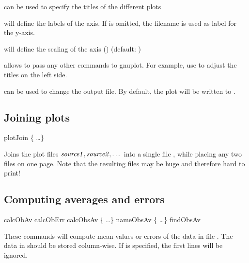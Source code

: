 \begin{essyntex}
\begin{arguments}
\item[\opt{titles \{ \var{title1} \var{title2} \dots \}}] can be used
  to specify the titles of the different plots
\item[\opt{labels \{ \var{xlabel} \opt{\var{ylabel}} \}}] will define the
  labels of the axis. If  is omitted, the filename
   is used as label for the y-axis.
\item[\opt{scale \var{gnuplot-scale}}] will define the scaling of the
  axis (\eg {}) (default: )
\item[\opt{cmd \var{gnuplot-command}}] allows to pass any other
  commands to gnuplot. For example, use
   to adjust the titles on
  the left side.
\item[\opt{out \var{filebase}}] can be used to change the output
  file. By default, the plot will be written to .
\end{arguments}

\subsection{Joining plots}
\begin{essyntax}
  plotJoin \{   \dots \} 
\end{essyntax}
Joins the plot files $\mbox{\textrm{\textit{source1}}}, \mbox{\textrm{\textit{source2}}}, \dots$ into a
single file , while placing any two files on one page.
Note that the resulting files may be huge and therefore hard to print!


\subsection{Computing averages and errors}

\begin{essyntax}
   calcObAv   
   calcObErr   
   calcObsAv  \{   \dots \} 
   nameObsAv  \{   \dots \} 
   findObsAv  
\end{essyntax}

These commands will compute mean values or errors of the data in file
. The data in  should be stored column-wise. If
 is specified, the first  lines will be ignored.


\end{essyntex}
